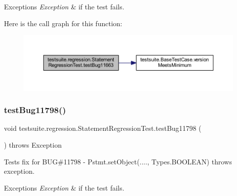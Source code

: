 \begin{DoxyExceptions}{Exceptions}
{\em Exception} & if the test fails. \\
\hline
\end{DoxyExceptions}
Here is the call graph for this function\+:
\nopagebreak
\begin{figure}[H]
\begin{center}
\leavevmode
\includegraphics[width=350pt]{classtestsuite_1_1regression_1_1_statement_regression_test_aad9a4a5d28e804097e535c055838a4e6_cgraph}
\end{center}
\end{figure}
\mbox{\label{classtestsuite_1_1regression_1_1_statement_regression_test_a2e9381e517b516fe84e4574229646579}} 
\subsubsection{\texorpdfstring{test\+Bug11798()}{testBug11798()}}
{\footnotesize\ttfamily void testsuite.\+regression.\+Statement\+Regression\+Test.\+test\+Bug11798 (\begin{DoxyParamCaption}{ }\end{DoxyParamCaption}) throws Exception}

Tests fix for B\+UG\#11798 -\/ Pstmt.\+set\+Object(...., Types.\+B\+O\+O\+L\+E\+AN) throws exception.


\begin{DoxyExceptions}{Exceptions}
{\em Exception} & if the test fails. \\
\hline
\end{DoxyExceptions}
\mbox{\label{classtestsuite_1_1regression_1_1_statement_regression_test_a19979b206b845d9832b82138c997334b}} 
